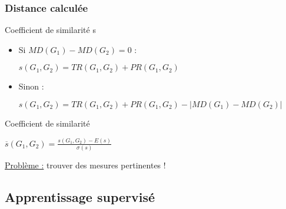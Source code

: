\documentclass{beamer}
\begin{document}
\begin{frame}
\frametitle{Distance calculée}

\begin{block}{Coefficient de similarité s}
\begin{itemize}
\item Si $MD(G_{1}) - MD(G_{2}) = 0$ : 
\begin{center}
$ s(G_{1},G_{2}) = TR(G_{1},G_{2}) + PR(G_{1},G_{2})$
\end{center}
\item Sinon : 
\begin{center}
$ s(G_{1},G_{2}) = TR(G_{1},G_{2}) + PR(G_{1},G_{2}) - | MD(G_{1}) - MD(G_{2}) |$
\end{center}
\end{itemize}
\end{block}

\pause

\begin{block}{Coefficient de similarité }
\begin{center}
$\overline{s}(G_{1},G_{2}) = \frac{s(G_{1},G_{2}) - E(s)}{\sigma(s)}$
\end{center}
\end{block}



\uline{Problème :} trouver des mesures pertinentes !


\end{frame}

\subsection{Apprentissage supervisé}
\end{document}
